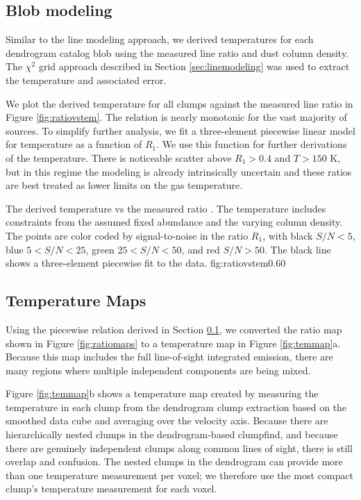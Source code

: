 \subsection{Blob modeling}
\label{sec:dendromod}
Similar to the line modeling approach, we derived temperatures for each
dendrogram catalog blob using the measured line ratio and dust column density.
The $\chi^2$ grid approach described in Section \ref{sec:linemodeling} was used
to extract the temperature and associated error.

We plot the derived temperature for all clumps against the measured line ratio
in Figure \ref{fig:ratiovstem}.  The relation is nearly monotonic for the vast
majority of sources.  To simplify further analysis, we fit a three-element
piecewise linear model for temperature as a function of $R_1$.  We use this
function for further derivations of the temperature.  There is noticeable
scatter above $R_1 > 0.4$ and $T>150$ K, but in this regime the modeling is
already intrinsically uncertain and these ratios are best treated as lower
limits on the gas temperature.

{The derived temperature vs the measured ratio \Rone.  The temperature
includes constraints from the assumed fixed \formaldehyde abundance and the 
varying column density.  The points are color coded by signal-to-noise in the
ratio $R_1$, with black $S/N < 5$, blue $5 < S/N < 25$, green $25 < S/N < 50$,
and red $S/N > 50$.  The black line shows a three-element piecewise fit
to the data.
}
{fig:ratiovstem}{0.6}{0}

\subsection{Temperature Maps}
\label{sec:formaldehydetemmap}
Using the piecewise relation derived in Section \ref{sec:dendromod}, we
converted the ratio map shown in Figure \ref{fig:ratiomaps} to a temperature
map in Figure \ref{fig:temmap}a.  Because this map includes the full line-of-sight
integrated emission, there are many regions where multiple independent components
are being mixed.

Figure \ref{fig:temmap}b shows a temperature map created by measuring the
temperature in each clump from the dendrogram clump extraction based on the
smoothed data cube and averaging over the velocity axis.  Because there are
hierarchically nested clumps in the dendrogram-based clumpfind, and because
there are genuinely independent clumps along common lines of sight, there is
still overlap and confusion.  The nested clumps in the dendrogram can provide
more than one temperature measurement per voxel; we therefore use the most
compact clump's temperature measurement for each voxel.

